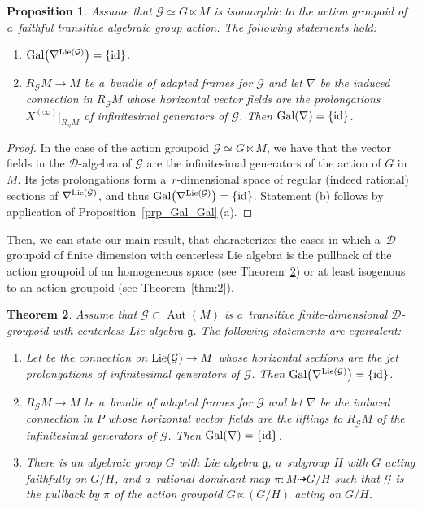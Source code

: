 \documentclass[10pt,a4paper]{amsart}
\numberwithin{equation}{section}
\newtheorem{Theorem}{Theorem}[section]
\newtheorem{Proposition}[Theorem]{Proposition}
\theoremstyle{definition}
\begin{document}
\begin{Proposition}
Assume that $\mathcal G \simeq G\ltimes M$ is isomorphic to the action groupoid of a~faithful transitive algebraic group action. The following statements hold:
\begin{enumerate}\itemsep=0pt
\item[$(a)$] $\rm Gal\bigl(\nabla^{{\rm Lie}(\mathcal G)}\bigr) = \{\rm id\}$.
\item[$(b)$] $R_{\mathcal G}M\to M$ be a~bundle of adapted frames for $\mathcal G$ and let $\nabla$ be the induced connection in $R_{\mathcal G}M$ whose horizontal vector fields are the prolongations $X^{(\infty)}|_{R_\mathcal GM}$ of infinitesimal generators of $\mathcal G$. Then ${\rm Gal}(\nabla) = \{\rm id\}$.
\end{enumerate}
\end{Proposition}

\begin{proof}
In the case of the action groupoid $\mathcal G \simeq G\ltimes M$, we have that the vector fields in the $\mathcal D$-algebra of $\mathcal G$ are the infinitesimal generators of the action of $G$ in $M$. Its jets prolongations form a~$r$-dimensional space of regular (indeed rational) sections of $\nabla^{\rm Lie (\mathcal G)}$, and thus ${\rm Gal}\bigl(\nabla^{{\rm Lie}(\mathcal G)}\bigr) = \{{\rm id}\}$. Statement (b) follows by application of Proposition~\ref{prp_Gal_Gal}\,(a).
\end{proof}

Then, we can state our main result, that characterizes the cases in which a~$\mathcal D$-groupoid of finite dimension with centerless Lie algebra is the pullback of the action groupoid of an homogeneous space (see Theorem~\ref{thm:1}) or at least isogenous to an action groupoid (see Theorem~\ref{thm:2}).

\begin{Theorem}\label{thm:1}
Assume that $\mathcal G\subset\operatorname{Aut}(M)$ is a~transitive finite-dimensional $\mathcal D$-groupoid with centerless Lie algebra $\mathfrak g$. The following statements are equivalent:
\begin{enumerate}\itemsep=0pt
\item[$(a)$] Let  be the connection on ${\rm Lie}(\mathcal G)\to M$ whose horizontal sections are the jet prolongations of infinitesimal generators of $\mathcal G$. Then $\rm Gal\bigl(\nabla^{{\rm Lie}(\mathcal G)}\bigr) = \{\rm id\}$.
\item[$(b)$] $R_{\mathcal G}M\to M$ be a~bundle of adapted frames for $\mathcal G$ and let $\nabla$ be the induced connection in $P$ whose horizontal vector fields are the liftings to $R_{\mathcal G}M$ of the infinitesimal generators of $\mathcal G$. Then ${\rm Gal}(\nabla) = \{\rm id\}$.
\item[$(c)$] There is an algebraic group $G$ with Lie algebra $\mathfrak g$, a~subgroup $H$ with $G$ acting faithfully on $G/H$, and a~rational dominant map $\pi\colon M\dasharrow G/H$ such that $\mathcal G$ is the pullback by $\pi$ of the action groupoid $G\ltimes(G/H)$ acting on $G/H$.
\end{enumerate}
\end{Theorem}
\end{document}
